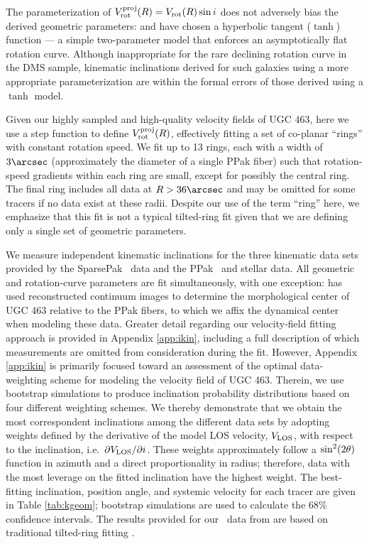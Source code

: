 \documentclass[apj,iop,numberedappendix]{emulateapj}
\begin{document}
The parameterization of $V_{\rm rot}^{\rm proj}(R) = V_{\rm rot}(R)\sin i$ does not adversely bias
the derived geometric parameters: \citet{2003ApJ...599L..79A} and
\citet{2008ApJ...688..990A} have chosen a hyperbolic tangent ($\tanh$) function
--- a simple two-parameter model that enforces an asymptotically flat rotation
curve.  Although inappropriate for the rare declining rotation curve in the DMS
sample, kinematic inclinations derived for such galaxies using a more
appropriate parameterization \citep[e.g.,][]{1997AJ....114.2402C} are within the
formal errors of those derived using a $\tanh$ model.

Given our highly sampled and high-quality velocity fields of UGC 463, here we
use a step function to define $V_{\rm rot}^{\rm proj}(R)$, effectively fitting a set of
co-planar ``rings'' with constant rotation speed.  We fit up to 13 rings, each
with a width of $3\arcsec$ (approximately the diameter of a single PPak fiber)
such that rotation-speed gradients within each ring are small, except for
possibly the central ring.  The final ring includes all data at $R>36\arcsec$
and may be omitted for some tracers if no data exist at these radii.  Despite
our use of the term ``ring'' here, we emphasize that this fit is not a typical
tilted-ring fit given that we are defining only a single set of geometric
parameters.

We measure independent kinematic inclinations for the three kinematic data sets
provided by the SparsePak \halp\ data and the PPak \oiii\ and stellar data.  All
geometric and rotation-curve parameters are fit simultaneously, with one
exception: \citet{TPKMPhD} has used reconstructed continuum images to determine
the morphological center of UGC 463 relative to the PPak fibers, to which we
affix the dynamical center when modeling these data.  Greater detail regarding
our velocity-field fitting approach is provided in Appendix \ref{app:ikin},
including a full description of which measurements are omitted from
consideration during the fit.  However, Appendix \ref{app:ikin} is primarily
focused toward an assessment of the optimal data-weighting scheme for modeling
the velocity field of UGC 463.  Therein, we use bootstrap simulations \citep[see
.2 of][]{NR3} to produce inclination probability distributions based
on four different weighting schemes.  We thereby demonstrate that we obtain the
most correspondent inclinations among the different data sets by adopting
weights defined by the derivative of the model LOS velocity, $V_{\rm LOS}$, with
respect to the inclination, i.e.\ $\partial V_{\rm LOS}/\partial i$.  These weights
approximately follow a $\sin^2(2\theta)$ function in azimuth and a direct
proportionality in radius; therefore, data with the most leverage on the fitted
inclination \citep[at approximately $\pm45\arcdeg$ from the major
axis;][]{2003ApJ...599L..79A} have the highest weight.  The best-fitting
inclination, position angle, and systemic velocity for each tracer are given in
Table \ref{tab:kgeom}; bootstrap simulations are used to calculate the 68\%
confidence intervals.  The results provided for our \hone\ data from
\citet{TPKMPhD} are based on traditional tilted-ring fitting
\citep{1989A&A...223...47B}.
\end{document}
